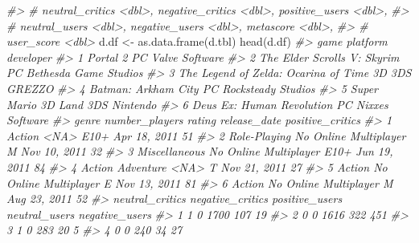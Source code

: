 \documentclass[
]{book}
\newenvironment{Shaded}{\begin{snugshade}}{\end{snugshade}}
\newcommand{\CommentTok}[1]{\textcolor[rgb]{0.56,0.35,0.01}{\textit{#1}}}
\newcommand{\FunctionTok}[1]{\textcolor[rgb]{0.00,0.00,0.00}{#1}}
\newcommand{\NormalTok}[1]{#1}
\newcommand{\OtherTok}[1]{\textcolor[rgb]{0.56,0.35,0.01}{#1}}
\begin{document}
\begin{Shaded}
\begin{Highlighting}[]
\CommentTok{\#\textgreater{} \#   neutral\_critics \textless{}dbl\textgreater{}, negative\_critics \textless{}dbl\textgreater{}, positive\_users \textless{}dbl\textgreater{},}
\CommentTok{\#\textgreater{} \#   neutral\_users \textless{}dbl\textgreater{}, negative\_users \textless{}dbl\textgreater{}, metascore \textless{}dbl\textgreater{},}
\CommentTok{\#\textgreater{} \#   user\_score \textless{}dbl\textgreater{}}
\NormalTok{d.df }\OtherTok{\textless{}{-}} \FunctionTok{as.data.frame}\NormalTok{(d.tbl)}
\FunctionTok{head}\NormalTok{(d.df)}
\CommentTok{\#\textgreater{}                                      game platform             developer}
\CommentTok{\#\textgreater{} 1                                Portal 2       PC        Valve Software}
\CommentTok{\#\textgreater{} 2             The Elder Scrolls V: Skyrim       PC Bethesda Game Studios}
\CommentTok{\#\textgreater{} 3 The Legend of Zelda: Ocarina of Time 3D      3DS                GREZZO}
\CommentTok{\#\textgreater{} 4                     Batman: Arkham City       PC    Rocksteady Studios}
\CommentTok{\#\textgreater{} 5                     Super Mario 3D Land      3DS              Nintendo}
\CommentTok{\#\textgreater{} 6               Deus Ex: Human Revolution       PC       Nixxes Software}
\CommentTok{\#\textgreater{}              genre        number\_players rating release\_date positive\_critics}
\CommentTok{\#\textgreater{} 1           Action                  \textless{}NA\textgreater{}   E10+ Apr 18, 2011               51}
\CommentTok{\#\textgreater{} 2     Role{-}Playing No Online Multiplayer      M Nov 10, 2011               32}
\CommentTok{\#\textgreater{} 3    Miscellaneous No Online Multiplayer   E10+ Jun 19, 2011               84}
\CommentTok{\#\textgreater{} 4 Action Adventure                  \textless{}NA\textgreater{}      T Nov 21, 2011               27}
\CommentTok{\#\textgreater{} 5           Action No Online Multiplayer      E Nov 13, 2011               81}
\CommentTok{\#\textgreater{} 6           Action No Online Multiplayer      M Aug 23, 2011               52}
\CommentTok{\#\textgreater{}   neutral\_critics negative\_critics positive\_users neutral\_users negative\_users}
\CommentTok{\#\textgreater{} 1               1                0           1700           107             19}
\CommentTok{\#\textgreater{} 2               0                0           1616           322            451}
\CommentTok{\#\textgreater{} 3               1                0            283            20              5}
\CommentTok{\#\textgreater{} 4               0                0            240            34             27}

\end{Highlighting}
\end{Shaded}
\end{document}
